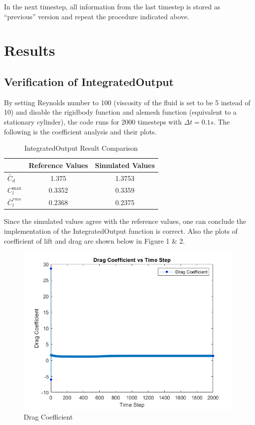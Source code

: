 \documentclass[a4paper,12pt]{article} %
\begin{document}
In the next timestep, all information from the last timestep is stored as ``previous'' version and repeat the 
procedure indicated above. 

\section*{Results}
\subsection*{Verification of IntegratedOutput}
By setting Reynolds number to 100 (viscosity of the fluid is set to be 5 instead of 10) and disable the rigidbody function 
and alemesh function (equivalent to a stationary cylinder), the code runs for 2000 timesteps with $\varDelta  t =  0.1s$.
The following is the coefficient analysis and their plots.
\begin{table}[ht]
    \centering
    \caption{IntegratedOutput Result Comparison}
    \begin{tabular}{|l|c|c|}
      \hline
      \rule{0pt}{15pt}
       & Reference Values & Simulated Values \\
      \hline
      \rule{0pt}{15pt}
      $\bar C_d$ & 1.375 & 1.3753 \\
      \hline
      \rule{0pt}{15pt}
      $C_l^{\max}$ & 0.3352 & 0.3359 \\
      \hline
      \rule{0pt}{15pt}
      $\bar C_l^{rms}$ & 0.2368 & 0.2375 \\
      \hline
    \end{tabular}
  \end{table}
Since the simulated values agree with the reference values, one can conclude the implementation of the IntegratedOutput
function is correct. Also the plots of coefficient of lift and drag are shown below in Figure 1 \& 2.
\begin{figure}[htbp]
    \center
    \includegraphics[scale=0.6]{Cl.png}
    \caption{Drag Coefficient}
\end{figure}
\end{document}
